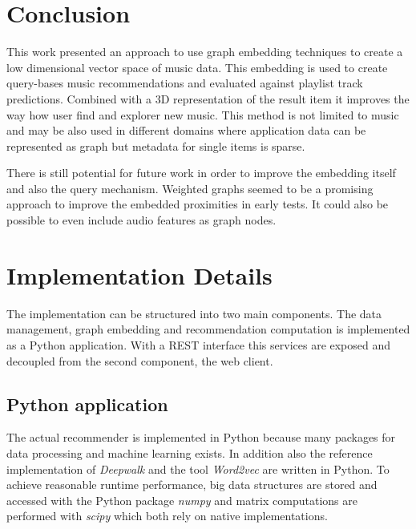 \documentclass[sigconf]{acmart}
\begin{document}
\section{Conclusion}
This work presented an approach to use graph embedding techniques to create a low dimensional vector space of music data. This embedding is used to create query-bases music recommendations and evaluated against playlist track predictions. Combined with a 3D representation of the result item it improves the way how user find and explorer new music. 
This method is not limited to music and may be also used in different domains where application data can be represented as graph but metadata for single items is sparse.

There is still potential for future work in order to improve the embedding itself and also the query mechanism. Weighted graphs seemed to be a promising approach to improve the embedded proximities in early tests. It could also be possible to even include audio features as graph nodes.






\newpage
\appendix
\section{Implementation Details}

The implementation can be structured into two main components. The data management, graph embedding and recommendation computation is implemented as a Python application. With a REST interface this services are exposed and decoupled from the second component, the web client.

\subsection{Python application}
The actual recommender is implemented in Python because many packages for data processing and machine learning exists. In addition also the reference implementation of \emph{Deepwalk} and the tool \emph{Word2vec} are written in Python. To achieve reasonable runtime performance, big data structures are stored and accessed with the Python package \emph{numpy} and matrix computations are performed with \emph{scipy} which both rely on native implementations.

\end{document}
